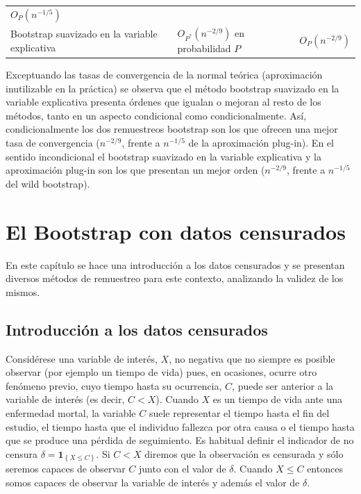 \documentclass[]{book}
\theoremstyle{definition}
\theoremstyle{definition}
\theoremstyle{definition}
\theoremstyle{remark}
\begin{document}
\begin{longtable}[]{@{}lll@{}}
\begin{minipage}[t]{0.29\columnwidth}
\(O_{P}\left(n^{-1/5}\right)\)\strut
\end{minipage}\tabularnewline
\begin{minipage}[t]{0.25\columnwidth}\raggedright\strut
Bootstrap suavizado en la variable explicativa\strut
\end{minipage} & \begin{minipage}[t]{0.37\columnwidth}\raggedright\strut
\(O_{P^{\ast}}\left( n^{-2/9}\right)\) en probabilidad \(P\)\strut
\end{minipage} & \begin{minipage}[t]{0.29\columnwidth}\raggedright\strut
\(O_{P}\left(n^{-2/9}\right)\)\strut
\end{minipage}\tabularnewline
\bottomrule
\end{longtable}

Exceptuando las tasas de convergencia de la normal teórica (aproximación
inutilizable en la práctica) se observa que el método bootstrap
suavizado en la variable explicativa presenta órdenes que igualan o
mejoran al resto de los métodos, tanto en un aspecto condicional como
condicionalmente. Así, condicionalmente los dos remuestreos bootstrap
son los que ofrecen una mejor tasa de convergencia (\(n^{-2/9}\), frente
a \(n^{-1/5}\) de la aproximación plug-in). En el sentido incondicional
el bootstrap suavizado en la variable explicativa y la aproximación
plug-in son los que presentan un mejor orden (\(n^{-2/9}\), frente a
\(n^{-1/5}\) del wild bootstrap).

\chapter{El Bootstrap con datos censurados}\label{cap8}

En este capítulo se hace una introducción a los datos censurados y se
presentan diversos métodos de remuestreo para este contexto, analizando
la validez de los mismos.

\section{Introducción a los datos
censurados}\label{introduccion-a-los-datos-censurados}

Considérese una variable de interés, \(X\), no negativa que no siempre
es posible observar (por ejemplo un tiempo de vida) pues, en ocasiones,
ocurre otro fenómeno previo, cuyo tiempo hasta su ocurrencia, \(C\),
puede ser anterior a la variable de interés (es decir, \(C<X\)). Cuando
\(X\) es un tiempo de vida ante una enfermedad mortal, la variable \(C\)
suele representar el tiempo hasta el fin del estudio, el tiempo hasta
que el individuo fallezca por otra causa o el tiempo hasta que se
produce una pérdida de seguimiento. Es habitual definir el indicador de
no censura \(\delta =\mathbf{1}_{\left\{ X\leq C\right\} }\). Si \(C<X\)
diremos que la observación es censurada y sólo seremos capaces de
observar \(C\) junto con el valor de \(\delta\). Cuando \(X\leq C\)
entonces somos capaces de observar la variable de interés y además el
valor de \(\delta\).
\end{document}
